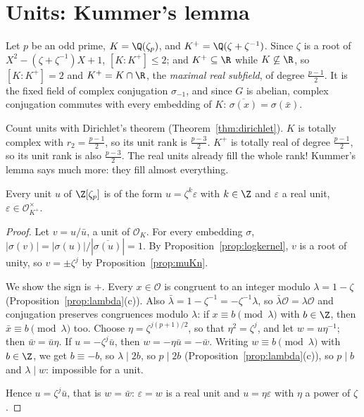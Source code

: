 \section{Units: Kummer's lemma}

Let $p$ be an odd prime, $K=\Q(\zeta_p)$, and $K^+=\Q(\zeta+\zeta^{-1})$. Since $\zeta$ is a root of $X^2-(\zeta+\zeta^{-1})X
+1$, $[K:K^+]\le2$; and $K^+\subseteq\R$ while $K\not\subseteq\R$, so $[K:K^+]=2$ and $K^+=K\cap\R$, the \emph{maximal real
subfield}, of degree $\frac{p-1}2$. It is the fixed field of complex conjugation $\sigma_{-1}$, and since $G$ is abelian,
complex conjugation commutes with every embedding of $K$: $\overline{\sigma(x)}=\sigma(\bar x)$.

Count units with Dirichlet's theorem (Theorem~\ref{thm:dirichlet}). $K$ is totally complex with $r_2=\frac{p-1}2$, so its unit
rank is $\frac{p-3}2$. $K^+$ is totally real of degree $\frac{p-1}2$, so its unit rank is also $\frac{p-3}2$. The real units
already fill the whole rank! Kummer's lemma says much more: they fill almost everything.

\begin{theorem}\label{thm:kummerlemma}
Every unit $u$ of $\Z[\zeta_p]$ is of the form $u=\zeta^k\varepsilon$ with $k\in\Z$ and $\varepsilon$ a real unit, $\varepsilon\in
\mathcal O_{K^+}^\times$.
\end{theorem}
\begin{proof}
Let $v=u/\bar u$, a unit of $\mathcal O_K$. For every embedding $\sigma$, $|\sigma(v)|=|\sigma(u)|/|\overline{\sigma(u)}|=1$.
By Proposition~\ref{prop:logkernel}, $v$ is a root of unity, so $v=\pm\zeta^j$ by Proposition~\ref{prop:muKn}.

We show the sign is $+$. Every $x\in\mathcal O$ is congruent to an integer modulo $\lambda=1-\zeta$
(Proposition~\ref{prop:lambda}(c)). Also $\bar\lambda=1-\zeta^{-1}=-\zeta^{-1}\lambda$, so $\bar\lambda\mathcal O=\lambda\mathcal
O$ and conjugation preserves congruences modulo $\lambda$: if $x\equiv b\pmod\lambda$ with $b\in\Z$, then $\bar x\equiv b
\pmod\lambda$ too. Choose $\eta=\zeta^{j(p+1)/2}$, so that $\eta^2=\zeta^j$, and let $w=u\eta^{-1}$; then $\bar w=\bar u\eta$. If
$u=-\zeta^j\bar u$, then $w=-\eta\bar u=-\bar w$. Writing $w\equiv b\pmod\lambda$ with $b\in\Z$, we get $b\equiv-b$, so
$\lambda\mid2b$, so $p\mid 2b$ (Proposition~\ref{prop:lambda}(c)), so $p\mid b$ and $\lambda\mid w$: impossible for a unit.

Hence $u=\zeta^j\bar u$, that is $w=\bar w$: $\varepsilon=w$ is a real unit and $u=\eta\varepsilon$ with $\eta$ a power of
$\zeta$.
\end{proof}

